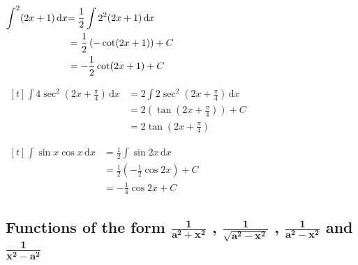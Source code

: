 \documentclass[11pt,a4paper]{book}
\let\csc\relax
\DeclareMathOperator{\csc}{cosec}
\begin{document}
\begin{example}
\begin{tasks}[label=(\alph*),label-width=3.5ex,after-item-skip = 2cm]
\task
$
\begin{aligned}[t]
{\displaystyle \int\csc^{2}(2x+1)\, \mathrm{d}x} & {\displaystyle =\frac{1}{2}\int2\csc^{2}(2x+1)\, \mathrm{d}x}\\
 & =\frac{1}{2}\left(-\cot(2x+1)\right)+C\\
 & =-\frac{1}{2}\cot(2x+1)+C
\end{aligned}
$

\task
$
\begin{aligned}[t]
{\displaystyle \int4\sec^{2}\left(2x+\frac{\pi}{4}\right)\, \mathrm{d}x} & {\displaystyle ={\displaystyle 2\int2\sec^{2}\left(2x+\frac{\pi}{4}\right)\, \mathrm{d}x}}\\
 & =2\left(\tan\left(2x+\frac{\pi}{4}\right)\right)+C\\
 & =2\tan\left(2x+\frac{\pi}{4}\right)
\end{aligned}
$

\task
$
\begin{aligned}[t]
{\displaystyle \int\sin x\cos x\, \mathrm{d}x} & {\displaystyle =\frac{1}{2}\int\sin2x\, \mathrm{d}x}\\
 & =\frac{1}{2}\left(-\frac{1}{2}\cos2x\right)+C\\
 & =-\frac{1}{4}\cos2x+C
\end{aligned}
$

\end{tasks}

\end{example}

\newpage{}

\subsection{Functions of the form ${\displaystyle \boldsymbol{\frac{1}{a^{2}+x^{2}}}}$
, ${\displaystyle \boldsymbol{\frac{1}{\sqrt{a^{2}-x^{2}}}}}$ , ${\displaystyle \boldsymbol{\frac{1}{a^{2}-x^{2}}}}$
and ${\displaystyle \boldsymbol{\frac{1}{x^{2}-a^{2}}}}$}
\end{document}
